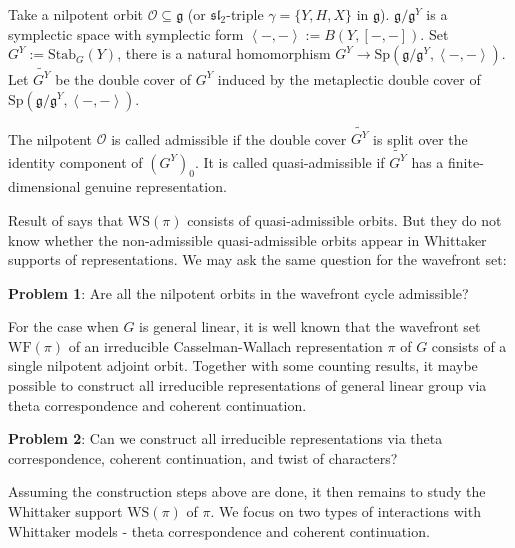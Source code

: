 \documentclass[12pt]{amsart}
\numberwithin{equation}{section}
\begin{document}
Take a nilpotent orbit $\mathcal{O} \subseteq \mathfrak{g}$ (or $\mathfrak{sl_2}$-triple $\gamma = \{Y,H,X\}$ in $\mathfrak{g}$). $\mathfrak{g}/\mathfrak{g}^{Y}$ is a symplectic space with symplectic form $\left \langle -,- \right \rangle := B(Y,[-,-])$. Set $G^{Y} := \mathrm{Stab}_{G}(Y)$, there is a natural homomorphism $G^{Y} \to \mathrm{Sp}(\mathfrak{g}/\mathfrak{g}^{Y},\left\langle -,- \right\rangle)$. Let $\widetilde{G^{Y}}$ be the double cover of $G^{Y}$ induced by the metaplectic double cover of $\mathrm{Sp}(\mathfrak{g}/\mathfrak{g}^{Y},\left\langle -,- \right\rangle)$.
\begin{defn}
   The nilpotent $\mathcal{O}$ is called admissible if the double cover $\widetilde{G^Y}$ is split over the identity component of $(G^Y)_0$. It is called quasi-admissible if $\widetilde{G^Y}$ has a finite-dimensional genuine representation.
\end{defn} 

Result of \cite{GGS21} says that $\mathrm{WS}(\pi)$ consists of quasi-admissible orbits. But they do not know whether the non-admissible quasi-admissible orbits appear in Whittaker supports of representations. We may ask the same question for the wavefront set:

\textbf{Problem 1}: Are all the nilpotent orbits in the wavefront cycle admissible?

\medskip

For the case when $G$ is general linear, it is well known that the wavefront set $\mathrm{WF}(\pi)$ of an irreducible Casselman-Wallach representation $\pi$ of $G$ consists of a single nilpotent adjoint orbit. Together with some counting results, it maybe possible to construct all irreducible representations of general linear group via theta correspondence and coherent continuation.

\textbf{Problem 2}: Can we construct all irreducible representations via theta correspondence, coherent continuation, and twist of characters?

Assuming the construction steps above are done, it then remains to study the Whittaker support $\mathrm{WS}(\pi)$ of $\pi$. We focus on two types of interactions with Whittaker models - theta correspondence and coherent continuation.
\end{document}
